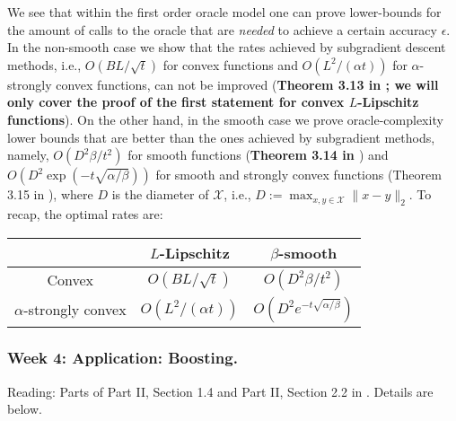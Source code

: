 We see that within the first order oracle model one can prove lower-bounds for the amount of calls to the oracle that are \emph{needed} to achieve a certain accuracy $\epsilon$.
In the non-smooth case we show that the rates achieved by subgradient descent methods, i.e., $O(BL/\sqrt{t})$ for convex functions and $O(L^2/(\alpha t))$ for $\alpha$-strongly convex functions, can not be improved (\textbf{Theorem 3.13 in \cite{bubeck}; we will only cover the proof of the first statement for convex $L$-Lipschitz functions}).
On the other hand, in the smooth case we prove oracle-complexity lower bounds that are better than the ones achieved by subgradient methods, namely, $O(D^2\beta/t^2)$ for smooth functions (\textbf{Theorem 3.14 in \cite{bubeck}}) and $O(D^2\exp(-t\sqrt{\alpha/\beta}))$ for smooth and strongly convex functions (Theorem 3.15 in \cite{bubeck}), where $D$ is the diameter of $\mathcal{X}$, i.e., $D:=\max_{x,y\in\mathcal{X}}\|x-y\|_2$. To recap, the optimal rates are:
\begin{center}
 \begin{tabular}{|c | c | c|}
 \hline
 & $L$-Lipschitz & $\beta$-smooth\\
 \hline
 Convex & $O(BL/\sqrt{t})$ & $O(D^2\beta/t^2)$\\
 \hline
 $\alpha$-strongly convex & $O(L^2/(\alpha t))$ & $O(D^2e^{-t\sqrt{\alpha/\beta}})$\\
 \hline
\end{tabular}
\end{center}

\subsubsection*{Week 4: Application: Boosting.}
Reading: Parts of Part II, Section 1.4 and Part II, Section 2.2 in \cite{rigollet}. Details are below.\\

